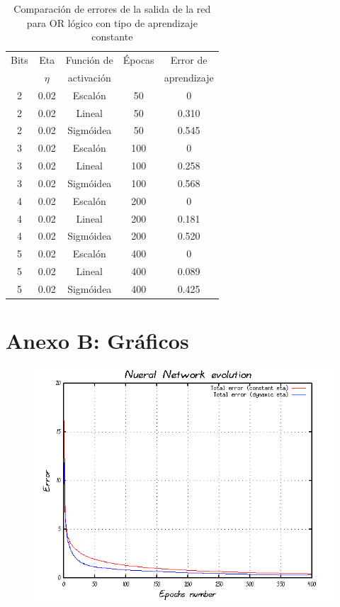 \documentclass[%
    final,
    reprint,
    notitlepage,
    narroweqnarray,
    inline,
    twoside,
    invited
    ]{ieee}
\begin{document}
\begin{table}[H]
\begin{center}
\begin{tabular}{|c|c|c|c|c|}
\hline
Bits &  Eta & Función de &  Épocas & Error de\\
 & $\eta$ & activación &  & aprendizaje\\

\hline
\hline

2 & 0.02 & Escalón & 50 & 0\\
\hline
2 & 0.02 & Lineal & 50 & 0.310\\
\hline
2 & 0.02 & Sigmóidea & 50 & 0.545\\
\hline
\hline
3 & 0.02 & Escalón & 100 & 0\\
\hline
3 & 0.02 & Lineal & 100 & 0.258\\
\hline
3 & 0.02 & Sigmóidea & 100 & 0.568\\
\hline
\hline
4 & 0.02 & Escalón & 200 & 0\\
\hline
4 & 0.02 & Lineal & 200 & 0.181\\
\hline
4 & 0.02 & Sigmóidea & 200 & 0.520\\
\hline
\hline
5 & 0.02 & Escalón & 400 & 0\\
\hline
5 & 0.02 & Lineal & 400 & 0.089\\
\hline
5 & 0.02 & Sigmóidea & 400 & 0.425\\
\hline

\end{tabular}
\end{center}
\caption{Comparación de errores de la salida de la red para OR lógico con tipo de aprendizaje constante}\label{tablaIDFS}
\end{table}

\clearpage

\section*{Anexo B: Gráficos}


\begin{figure}[H]
\begin{center}
\includegraphics[scale=0.85]{./images/g1.png}
\label{modelado}
\end{center}
\end{figure}
\end{document}
